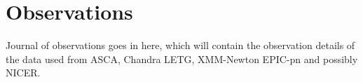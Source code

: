 \section{Observations}
    Journal of observations goes in here, which will contain the observation details of the data used from ASCA, Chandra LETG, XMM-Newton EPIC-pn and possibly NICER.
